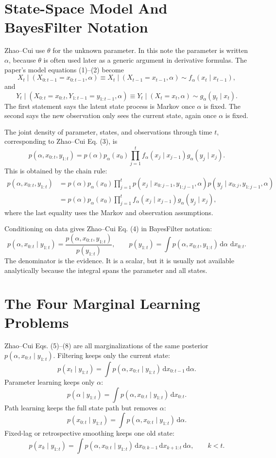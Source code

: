 \documentclass[11pt]{article}
\newcommand{\dd}{\,\mathrm d}
\begin{document}
\section{State-Space Model And BayesFilter Notation}

Zhao--Cui use \(\theta\) for the unknown parameter.  In this note the parameter
is written \(\alpha\), because \(\theta\) is often used later as a generic
argument in derivative formulas.  The paper's model equations (1)--(2) become
\[
    X_t\mid (X_{0:t-1}=x_{0:t-1},\alpha)
    \equiv
    X_t\mid (X_{t-1}=x_{t-1},\alpha)
    \sim f_\alpha(x_t\mid x_{t-1}),
    \tag{BF-1}
\]
and
\[
    Y_t\mid (X_{0:t}=x_{0:t},Y_{1:t-1}=y_{1:t-1},\alpha)
    \equiv
    Y_t\mid (X_t=x_t,\alpha)
    \sim g_\alpha(y_t\mid x_t).
    \tag{BF-2}
\]
The first statement says the latent state process is Markov once \(\alpha\) is
fixed.  The second says the new observation only sees the current state, again
once \(\alpha\) is fixed.

The joint density of parameter, states, and observations through time \(t\),
corresponding to Zhao--Cui Eq. (3), is
\[
    p(\alpha,x_{0:t},y_{1:t})
    =
    p(\alpha)p_\alpha(x_0)
    \prod_{j=1}^{t}
    f_\alpha(x_j\mid x_{j-1})g_\alpha(y_j\mid x_j).
    \tag{BF-3}
\]
This is obtained by the chain rule:
\[
\begin{aligned}
 p(\alpha,x_{0:t},y_{1:t})
 &=
 p(\alpha)p_\alpha(x_0)
 \prod_{j=1}^t
 p(x_j\mid x_{0:j-1},y_{1:j-1},\alpha)
 p(y_j\mid x_{0:j},y_{1:j-1},\alpha)\\
 &=
 p(\alpha)p_\alpha(x_0)
 \prod_{j=1}^t
 f_\alpha(x_j\mid x_{j-1})g_\alpha(y_j\mid x_j),
\end{aligned}
\]
where the last equality uses the Markov and observation assumptions.

Conditioning on data gives Zhao--Cui Eq. (4) in BayesFilter notation:
\[
    p(\alpha,x_{0:t}\mid y_{1:t})
    =
    \frac{p(\alpha,x_{0:t},y_{1:t})}
    {p(y_{1:t})},
    \qquad
    p(y_{1:t})
    =
    \int p(\alpha,x_{0:t},y_{1:t})
    \dd\alpha\,\dd x_{0:t}.
    \tag{BF-4}
\]
The denominator is the evidence.  It is a scalar, but it is usually not
available analytically because the integral spans the parameter and all states.

\section{The Four Marginal Learning Problems}

Zhao--Cui Eqs. (5)--(8) are all marginalizations of the same posterior
\(p(\alpha,x_{0:t}\mid y_{1:t})\).  Filtering keeps only the current state:
\[
    p(x_t\mid y_{1:t})
    =
    \int p(\alpha,x_{0:t}\mid y_{1:t})
    \dd x_{0:t-1}\dd\alpha .
    \tag{BF-5}
\]
Parameter learning keeps only \(\alpha\):
\[
    p(\alpha\mid y_{1:t})
    =
    \int p(\alpha,x_{0:t}\mid y_{1:t})\dd x_{0:t}.
    \tag{BF-6}
\]
Path learning keeps the full state path but removes \(\alpha\):
\[
    p(x_{0:t}\mid y_{1:t})
    =
    \int p(\alpha,x_{0:t}\mid y_{1:t})\dd\alpha .
    \tag{BF-7}
\]
Fixed-lag or retrospective smoothing keeps one old state:
\[
    p(x_k\mid y_{1:t})
    =
    \int p(\alpha,x_{0:t}\mid y_{1:t})
    \dd x_{0:k-1}\dd x_{k+1:t}\dd\alpha ,
    \qquad k<t .
    \tag{BF-8}
\]
\end{document}
